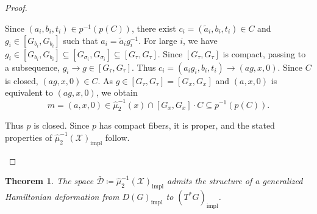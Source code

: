 \documentclass[reqno]{amsart}
\theoremstyle{plain}
\newtheorem{Thm}{Theorem}[section]
\theoremstyle{definition}
\begin{document}
\begin{proof}
\begin{enumerate}
Since $(a_i, b_i, t_i) \in p^{-1}(p(C))$, there exist $c_i = (\tilde{a}_i, b_i, t_i) \in C$ and $g_i \in [G_{b_i}, G_{b_i}]$ such that $a_i = \tilde{a}_i g_i^{-1}$. For large $i$, we have $g_i \in [G_{b_i}, G_{b_i}] \subseteq [G_{\sigma_i}, G_{\sigma_i}] \subseteq [G_\tau, G_\tau]$. Since $[G_\tau, G_\tau]$ is compact, passing to a subsequence, $g_i \to g \in [G_\tau, G_\tau]$. Thus $c_i = (a_i g_i, b_i, t_i) \to (ag, x, 0)$. Since $C$ is closed, $(ag, x, 0) \in C$. As $g \in [G_\tau, G_\tau] = [G_x, G_x]$ and $(a, x, 0)$ is equivalent to $(ag, x, 0)$, we obtain
\[
m = (a, x, 0) \in \widehat{\mu}_2^{-1}(x) \cap [G_x, G_x] \cdot C \subseteq p^{-1}(p(C)).
\]

Thus $p$ is closed. Since $p$ has compact fibers, it is proper, and the stated properties of $\widehat{\mu}_2^{-1}(\mathcal{X})_{\mathrm{impl}}$ follow.
\end{enumerate}
\end{proof}

\begin{Thm}\label{thm 7.4}
The space $\bar{\mathcal{D}} \coloneqq \widehat{\mu}_2^{-1}(\mathcal{X})_{\mathrm{impl}}$ admits the structure of a generalized Hamiltonian deformation from $D(G)_{\mathrm{impl}}$ to $(T^*G)_{\mathrm{impl}}$.
\end{Thm}
\end{document}

